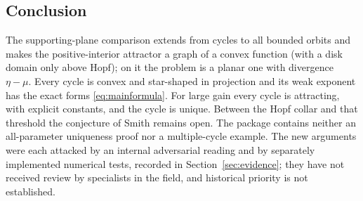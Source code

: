 \subsection{Conclusion}
The supporting-plane comparison extends from cycles to all bounded orbits and makes the positive-interior attractor a graph of a convex function (with a disk domain only above Hopf); on it the problem is a planar one with divergence $\eta-\mu$. Every cycle is convex and star-shaped in projection and its weak exponent has the exact forms \eqref{eq:mainformula}. For large gain every cycle is attracting, with explicit constants, and the cycle is unique. Between the Hopf collar and that threshold the conjecture of Smith remains open. The package contains neither an all-parameter uniqueness proof nor a multiple-cycle example. The new arguments were each attacked by an internal adversarial reading and by separately implemented numerical tests, recorded in Section~\ref{sec:evidence}; they have not received review by specialists in the field, and historical priority is not established.
